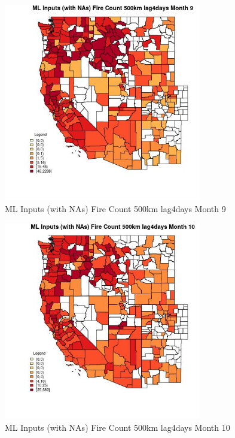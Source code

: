 \begin{figure} 
\centering  
\includegraphics[width=0.77\textwidth]{Code_Outputs/Report_ML_input_PM25_Step4_part_e_de_duplicated_aves_compiled_2019-05-21wNAs_CountyFire_Count_500km_lag4daysmedianMonth9.jpg} 
\caption{\label{fig:Report_ML_input_PM25_Step4_part_e_de_duplicated_aves_compiled_2019-05-21wNAsCountyFire_Count_500km_lag4daysmedianMonth9}ML Inputs (with NAs) Fire Count 500km lag4days Month 9} 
\end{figure} 
 

\begin{figure} 
\centering  
\includegraphics[width=0.77\textwidth]{Code_Outputs/Report_ML_input_PM25_Step4_part_e_de_duplicated_aves_compiled_2019-05-21wNAs_CountyFire_Count_500km_lag4daysmedianMonth10.jpg} 
\caption{\label{fig:Report_ML_input_PM25_Step4_part_e_de_duplicated_aves_compiled_2019-05-21wNAsCountyFire_Count_500km_lag4daysmedianMonth10}ML Inputs (with NAs) Fire Count 500km lag4days Month 10} 
\end{figure} 
 

